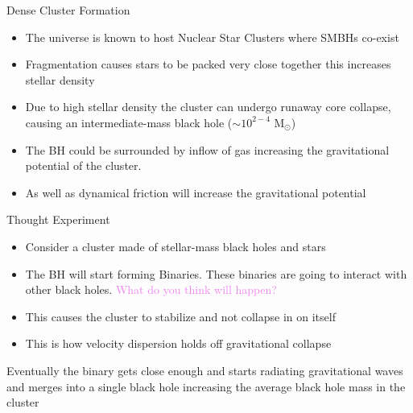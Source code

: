 \documentclass{beamer}
\begin{document}
\usebackgroundtemplate{}
\begin{frame}{Dense Cluster Formation}
    \begin{itemize}
        \item The universe is known to host Nuclear Star Clusters where SMBHs co-exist  \cite{Gaete2024}
        \item Fragmentation causes stars to be packed very close together this increases stellar density
        \item Due to high stellar density the cluster can undergo runaway core collapse, causing an intermediate-mass black hole ($\sim 10^{2-4}$ M$_\odot$)
        \item The BH could be surrounded by inflow of gas increasing the gravitational potential of the cluster. 
        \item As well as dynamical friction will increase the gravitational potential
    \end{itemize}
\end{frame}

\begin{frame}{Thought Experiment}
\begin{itemize}
    \item Consider a cluster made of stellar-mass black holes and stars
    \item The BH will start forming Binaries. These binaries are going to interact with other black holes. \textcolor{violet}{What do you think will happen?}
    \item This causes the cluster to stabilize and not collapse in on itself
    \item This is how velocity dispersion holds off gravitational collapse
\end{itemize}
\vspace{0.2cm}
Eventually the binary gets close enough and starts radiating gravitational waves and merges into a single black hole increasing the average black hole mass in the cluster
\end{frame}
\end{document}

